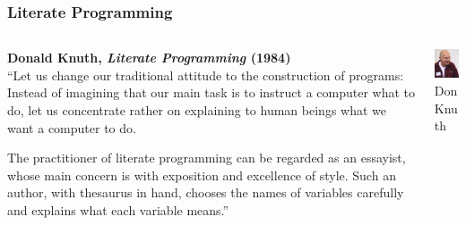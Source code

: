 \documentclass[10pt]{beamer}
\begin{document}
\begin{frame}
  \frametitle{Literate Programming}
  \begin{center}
    \begin{columns}[totalwidth=11cm]
      \begin{column}{0.65\textwidth}
        \textbf{Donald Knuth, \emph{Literate Programming} (1984)}\\
        ``Let us change our traditional attitude to the construction of programs: Instead of imagining that our main task is to instruct a computer what to do, let us concentrate rather on explaining to human beings what we want a computer to do.       

        The practitioner of literate programming can be regarded as an essayist, whose main concern is with exposition and excellence of style. Such an author, with thesaurus in hand, chooses the names of variables carefully and explains what each variable means.''
      \end{column}

      \begin{column}{0.35\textwidth}
        \begin{center}
          \includegraphics[width=2.5cm]{knuth.jpg}\\
          Don Knuth
        \end{center}
      \end{column}
    \end{columns}
  \end{center}

\end{frame}
\end{document}
